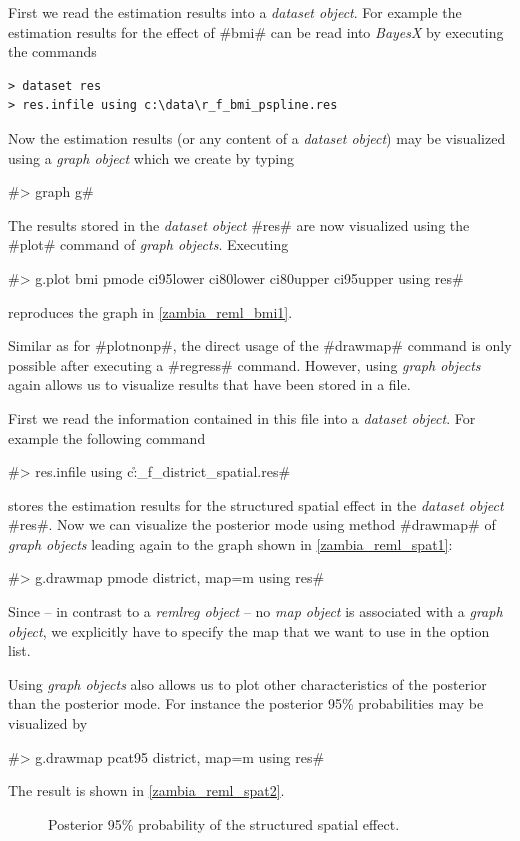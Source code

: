 \documentclass[11pt,a4paper,twoside]{bayesxreport}
\begin{document}
First we read the estimation results into a {\it dataset object}.
For example the estimation results for the effect of #bmi# can be
read into {\it BayesX} by executing the commands

\begin{verbatim}
> dataset res
> res.infile using c:\data\r_f_bmi_pspline.res
\end{verbatim}

Now the estimation results (or any content of a {\it dataset
object}) may be visualized using a {\it graph object} which we
create by typing

#> graph g#

The results stored in the {\em dataset object} #res# are now
visualized using the #plot# command of {\it graph objects}.
Executing

 #> g.plot bmi pmode ci95lower ci80lower ci80upper ci95upper using res#

reproduces the graph in \autoref{zambia_reml_bmi1}.

Similar as for #plotnonp#, the direct usage of the #drawmap# command
is only possible after executing a #regress# command. However, using
{\it graph objects} again allows us to visualize results that have
been stored in a file.

First we read the information contained in this file into a {\it
dataset object}. For example the following command

#> res.infile using c:\data\r_f_district_spatial.res#

stores the estimation results for the structured spatial effect in
the {\em dataset object} #res#. Now we can visualize the posterior
mode using method #drawmap# of {\it graph objects} leading again to
the graph shown in \autoref{zambia_reml_spat1}:

#> g.drawmap pmode district, map=m using res#

Since -- in contrast to a {\it remlreg object} -- no {\it map
object} is associated with a {\it graph object}, we explicitly have
to specify the map that we want to use in the option list.

Using {\it graph objects} also allows us to plot other
characteristics of the posterior than the posterior mode. For
instance the posterior 95\% probabilities may be visualized by

#> g.drawmap pcat95 district, map=m using res#

The result is shown in \autoref{zambia_reml_spat2}.

\begin{figure}[ht]
\begin{center}
{\it\caption{Posterior 95\% probability of the structured spatial
effect.\label{zambia_reml_spat2}}}
\end{center}
\end{figure}
\end{document}
